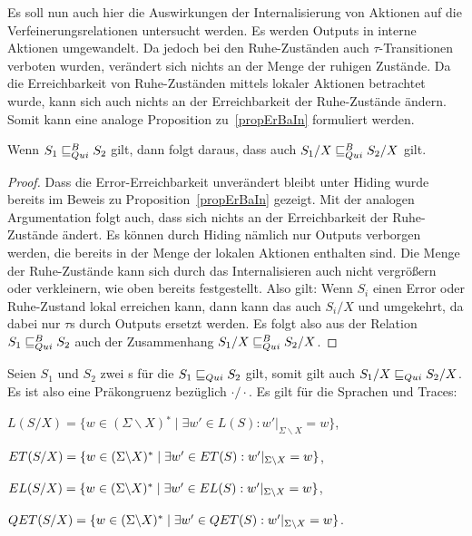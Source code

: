 Es soll nun auch hier die Auswirkungen der Internalisierung von Aktionen auf
die Verfeinerungsrelationen untersucht werden. Es werden Outputs in interne
Aktionen umgewandelt. Da jedoch bei den Ruhe-Zuständen auch
$\tau$-Transitionen verboten wurden, verändert sich nichts an der Menge der
ruhigen Zustände. Da die Erreichbarkeit von Ruhe-Zuständen mittels lokaler
Aktionen betrachtet wurde, kann sich auch nichts an der Erreichbarkeit der
Ruhe-Zustände ändern. Somit kann eine analoge Proposition zu~\ref{propErBaIn}
formuliert werden.

\begin{prop}
  Wenn $S_1\sqsubseteq _{Qui}^B S_2$ gilt, dann folgt daraus, dass auch $S_1/X\sqsubseteq _{Qui}^B S_2/X$
  gilt.
\end{prop}

\begin{proof}
  Dass die Error-Erreichbarkeit unverändert bleibt unter Hiding wurde bereits
  im Beweis zu Proposition~\ref{propErBaIn} gezeigt. Mit der analogen
  Argumentation folgt auch, dass sich nichts an der Erreichbarkeit der
  Ruhe-Zustände ändert. Es können durch Hiding nämlich nur Outputs verborgen
  werden, die bereits in der Menge der lokalen Aktionen enthalten sind. Die
  Menge der Ruhe-Zustände kann sich durch das Internalisieren auch nicht
  vergrößern oder verkleinern, wie oben bereits festgestellt. Also gilt: Wenn
  $S_i$ einen Error oder Ruhe-Zustand lokal erreichen kann, dann kann das auch
  $S_i/X$ und umgekehrt, da dabei nur $\tau$s durch Outputs ersetzt werden. Es
  folgt also aus der Relation $S_1 \sqsubseteq _{Qui}^B S_2$ auch der Zusammenhang $S_1/X
  \sqsubseteq _{Qui}^B S_2/X$.
\end{proof}

\begin{satz}
\label{satzPraeInterQui}
  Seien $S_1$ und $S_2$ zwei \EIO{}s für die $S_1\sqsubseteq _{Qui} S_2$ gilt, somit gilt
  auch $S_1/X\sqsubseteq _{Qui} S_2/X$. Es ist also \QRel{} eine Präkongruenz bezüglich
  $\cdot /\cdot$. Es gilt für die Sprachen und Traces:
  \begin{compactenum}[(i)]
  \item $L(S/X) = \{w\in (\Sigma\backslash X){}^*\mid \exists w'\in L(S):
      w'|_{\Sigma\backslash X} = w\}$,
    \item $ET{}(S/X) = \{w\in (\Sigma\backslash X){}^*\mid \exists
      w'\in ET{}(S): w'|_{\Sigma\backslash X} = w\}$,
    \item $EL{}(S/X) = \{w\in (\Sigma\backslash X){}^*\mid \exists w'\in
      EL(S): w'|_{\Sigma\backslash X} = w\}$,
    \item $QET{}(S/X) = \{w\in (\Sigma\backslash X){}^*\mid \exists w'\in
      QET{}(S):w'|_{\Sigma\backslash X}=w\}$.
  \end{compactenum}
\end{satz}

